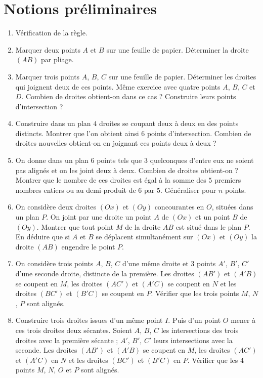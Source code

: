 \documentclass[12 pt]{report}
\theoremstyle{plain}
\newcounter{n}
\begin{document}
\chapter{Notions préliminaires} 
\begin{enumerate}
\item Vérification de la règle. 
\item Marquer deux points $A$ et $B$ sur une feuille de papier. Déterminer la droite $(AB)$ par pliage. 
\item Marquer trois points $A$, $B$, $C$ sur une feuille de papier. Déterminer les droites qui joignent deux de ces points. 
Même exercice avec quatre points $A$, $B$, $C$ et $D$. Combien de droites obtient-on dans ce cas ? Construire leurs points d'intersection ? 
\item Construire dans un plan $4$ droites se coupant deux à deux en des points distincts. Montrer que l'on obtient ainsi $6$ points d'intersection. Combien de droites nouvelles obtient-on en joignant ces points deux à deux ? 
\item On donne dans un plan $6$ points tels que $3$ quelconques d'entre eux ne soient pas alignés et on les joint deux à deux. Combien de droites obtient-on ? Montrer que le nombre de ces droites est égal à la somme des $5$ premiers nombres entiers ou au demi-produit de $6$ par $5$. Généraliser pour $n$ points. 
\item On considère deux droites $(Ox)$ et $(Oy)$ concourantes en $O$, situées dans un plan $P$. On joint par une droite un point $A$ de $(Ox)$ et un point $B$ de $(Oy)$. Montrer que tout point $M$ de la droite $AB$ est situé dans le plan $P$.\\ En déduire que si $A$ et $B$ se 
déplacent simultanément sur $(Ox)$ et $(Oy)$ la droite $(AB)$ engendre le point $P$.
\item On considère trois points $A$, $B$, $C$ d'une même droite et $3$ points $A'$, $B'$, $C'$ d'une seconde droite, distincte de la première. Les droites $(AB')$ et $(A'B)$ se coupent en $M$, les droites $(AC')$ et $(A'C)$ se coupent en $N$ et les droites $(BC')$ et $(B'C)$ se coupent en $P$. Vérifier que les trois points $M$, $N$, $P$ sont alignés.
\item Construire trois droites issues d'un même point $I$. Puis d'un point $O$ mener à ces trois droites deux sécantes. Soient $A$, $B$, $C$
les intersections des trois droites avec la première sécante ; $A'$, $B'$, $C'$ leurs intersections avec la seconde. Les droites $(AB')$ et 
$(A'B)$ se coupent en $M$, les droites $(AC')$ et $(A'C)$ en $N$ et les
droites $(BC')$ et $(B'C)$ en $P$. Vérifier que les $4$ points $M$, $N$, $O$ et $P$ sont alignés. 
\end{enumerate}
\end{document}
